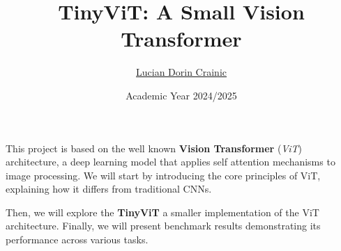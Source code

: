 \documentclass{beamer}
\title{TinyViT: A Small Vision Transformer}
\author{\href{mailto:crainic1938430@studenti.uniroma1.it}{Lucian Dorin Crainic}}
\date{Academic Year 2024/2025}
\begin{document}
\maketitle

\begin{frame}

  This project is based on the well known \textbf{Vision Transformer} (\textit{ViT}) architecture, a deep learning model that applies self attention mechanisms to image processing. We will start by introducing the core principles of ViT, explaining how it differs from traditional CNNs.

  \vspace{\baselineskip}

  Then, we will explore the \textbf{TinyViT} a smaller implementation of the ViT architecture. Finally, we will present benchmark results demonstrating its performance across various tasks.

\end{frame}











\backmatter
\end{document}
